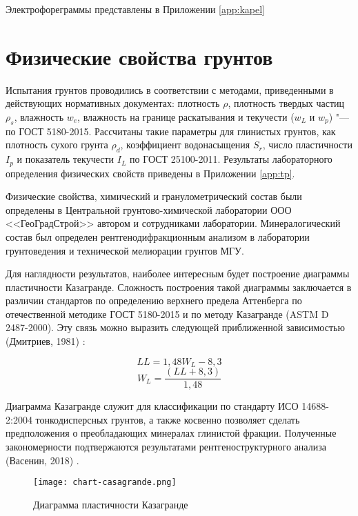 Электрофореграммы представлены в Приложении \ref{app:kapel}


\section{Физические свойства грунтов}

Испытания грунтов проводились в соответствии с методами, приведенными в действующих нормативных документах:
плотность $\rho$, 
плотность твердых частиц $\rho_s$, 
влажность $w_e$, 
влажность на границе раскатывания и текучести ($w_L$ и $w_p$) "--- по ГОСТ 5180-2015. 
Рассчитаны такие параметры для глинистых грунтов, как
плотность сухого грунта $\rho_d$,  
коэффициент водонасыщения $S_r$, 
число пластичности $I_p$ 
и показатель текучести $I_L$ по ГОСТ 25100-2011.
Результаты лабораторного определения физических свойств приведены в Приложении \ref{app:tp}.



Физические свойства, химический и гранулометрический состав были определены в Центральной грунтово-химической лаборатории ООО <<ГеоГрадСтрой>> автором и сотрудниками лаборатории. Минералогический состав был определен рентгенодифракционным анализом в лаборатории грунтоведения и технической мелиорации грунтов МГУ.


Для наглядности результатов, наиболее интересным будет построение диаграммы пластичности Казагранде. Сложность построения такой диаграммы заключается в различии  стандартов по определению верхнего предела Аттенберга по отечественной методике ГОСТ 5180-2015 и по методу Казагранде (ASTM D 2487-2000). Эту связь можно выразить следующей приближенной зависимостью (Дмитриев, 1981) \cite{dmitriev1981}:

$$LL = 1,48W_L - 8,3$$
$$W_L = {\frac{(LL + 8,3)}{1,48}}$$

Диаграмма Казагранде служит для классификации по стандарту ИСО 14688-2:2004 тонкодисперсных грунтов, а также косвенно позволяет сделать предположения о преобладающих минералах глинистой фракции. Полученные закономерности подтвержаются результатами рентгеноструктурного анализа (Васенин, 2018) \cite{vasenin2018}.


\begin{figure}[ht]
    \centering
    \texttt{[image: chart-casagrande.png]}
    \caption{Диаграмма пластичности Казагранде} \label{Fig:Caz}
  \end{figure}


